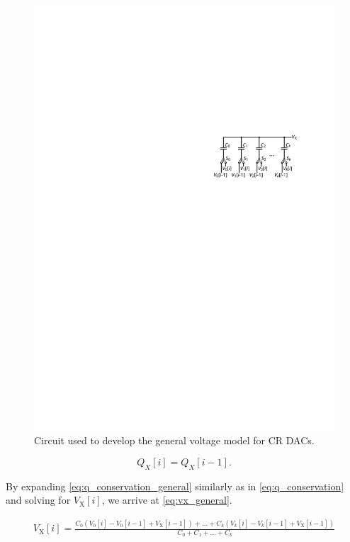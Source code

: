 \documentclass[]{article}
\begin{document}
\begin{figure}
	\centering
	\includegraphics[scale=1.0]{figures/capacitor_switch_general}
	\caption{Circuit used to develop the general voltage model for CR DACs.}
	\label{fig:capacitor_switch_general}
\end{figure}

\begin{equation}
	Q_X[i]=Q_X[i-1].
	\label{eq:q_conservation_general}
\end{equation}

By expanding \eqref{eq:q_conservation_general} similarly as in \eqref{eq:q_conservation} and solving for $V_\mathrm{X}[i]$, we arrive at \eqref{eq:vx_general}.

\begin{align}
	V_\mathrm{X}[i] = \frac{
		C_{0} \left( V_{0}[i] - V_{0}[i-1] + V_\mathrm{X}[i-1]\right) + \ldots +
		C_{k} \left( V_{k}[i] - V_{k}[i-1] + V_\mathrm{X}[i-1]\right)}
	{C_{0} + C_{1} + \ldots + C_{k}}
	\label{eq:vx_general}
\end{align}
\end{document}
